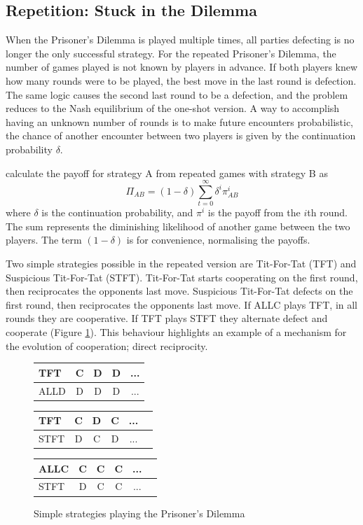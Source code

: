 \documentclass[a4paper,11pt,bcshonoursthesis,singlespace,oneside,thesisdraft,pdflatex]{cssethesis}
\begin{document}
\subsection{Repetition: Stuck in the Dilemma}
When the Prisoner's Dilemma is played multiple times, all parties defecting is no longer the only successful strategy. 
For the repeated Prisoner's Dilemma, the number of games played is not known by players in advance. 
If both players knew how many rounds were to be played, the best move in the last round is defection. 
The same logic causes the second last round to be a defection, and the problem reduces to the Nash equilibrium of the one-shot version. 
A way to accomplish having an unknown number of rounds is to make future encounters probabilistic, the chance of another encounter between two players is given by the continuation probability $\delta$.

\citet{garcia:PLoSOne:2012} calculate the payoff for strategy A from repeated games with strategy B as
\begin{equation}
\label{eqn:repeatedPayoff}
\Pi_{AB}=(1-\delta)\sum^{\infty}_{t=0} \delta^i\pi^i_{AB}
\end{equation}
where $\delta$ is the continuation probability, and $\pi^i$ is the payoff from the $i$th round. 
The sum represents the diminishing likelihood of another game between the two players. 
The term $(1-\delta)$ is for convenience, normalising the payoffs.
 
Two simple strategies possible in the repeated version are Tit-For-Tat (TFT) and Suspicious Tit-For-Tat (STFT). 
Tit-For-Tat starts cooperating on the first round, then reciprocates the opponents last move. 
Suspicious Tit-For-Tat defects on the first round, then reciprocates the opponents last move. 
If ALLC plays TFT, in all rounds they are cooperative.  
If TFT plays STFT they alternate defect and cooperate (Figure \ref{table:reciprocity}). 
This behaviour highlights an example of a mechanism for the evolution of cooperation; direct reciprocity. 

\begin{figure}[h]
\centering
\captionsetup{justification=centering}
\begin{tabular}{|l|c|c|c|c|}
\hline
TFT & C & D & D&...\\
\hline
ALLD & D & D &D&...\\
\hline
\end{tabular}\hfill
\begin{tabular}{|l|c|c|c|c|c|}
\hline
TFT & C & D&C&...\\
\hline
STFT & D & C&D&...\\
\hline
\end{tabular}\hfill
\begin{tabular}{|l|c|c|c|c|c|}
\hline
ALLC & C & C&C&...\\
\hline
STFT & D & C&C&...\\
\hline
\end{tabular}\hfill
\caption{Simple strategies playing the Prisoner's Dilemma}
\label{table:reciprocity}
\end{figure}
\end{document}
